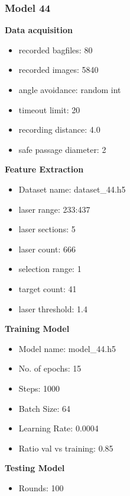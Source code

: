 \subsubsection{Model 44\label{model_44} }
\begin{multicols}{2}\textbf{Data acquisition}
\begin{itemize}
\setlength\itemsep{0.1em}
\item recorded bagfiles: 80
\item recorded images: 5840
\item angle avoidance: random int
\item timeout limit: 20
\item recording distance: 4.0
\item safe passage diameter: 2
\end{itemize}
\textbf{Feature Extraction}
\begin{itemize}
\setlength\itemsep{0.1em}
\item Dataset name: dataset\_44.h5
\item  laser range: 233:437
\item  laser sections: 5
\item  laser count: 666
\item  selection range: 1
\item  target count: 41
\item  laser threshold: 1.4
\end{itemize}
\columnbreak\textbf{Training Model}
\begin{itemize}
\setlength\itemsep{0.1em}
\item  Model name: model\_44.h5
\item  No. of epochs: 15
\item  Steps: 1000
\item  Batch Size: 64
\item  Learning Rate: 0.0004
\item  Ratio val vs training: 0.85
\end{itemize}
\textbf{Testing Model}
\begin{itemize}
\setlength\itemsep{0.1em}
\item Rounds: 100
\newline
\newline
\newline
\newline
\newline
\newline
\newline
\newline

\end{itemize}
\end{multicols}
